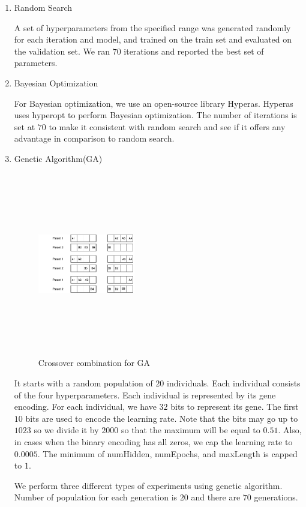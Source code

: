 \documentclass[conference]{IEEEtran}
\begin{document}
\begin{enumerate}
\item Random Search

A set of hyperparameters from the specified range was generated randomly for each iteration and model, and trained on the train set and evaluated on the validation set. We ran $70$ iterations and reported the best set of parameters.


\item Bayesian Optimization

For Bayesian optimization, we use an open-source library Hyperas\cite{hyperas}. Hyperas uses hyperopt\cite{hyperopt} to perform Bayesian optimization. The number of iterations is set at $70$ to make it consistent with random search and see if it offers any advantage in comparison to random search.
\item Genetic Algorithm(GA)
\begin{figure}
\includegraphics[width=0.4\textwidth, height=8cm, keepaspectratio]{GA.png}
\caption{ Crossover combination for GA }
 \label{fig:ga}
\end{figure}

It starts with a random population of $20$ individuals. Each individual consists of the four hyperparameters. Each individual is represented by its gene encoding. For each individual, we have $32$ bits to represent its gene. The first $10$ bits are used to encode the learning rate. Note that the bits may go up to $1023$ so we divide it by $2000$ so that the maximum will be equal to $0.51$. Also, in cases when the binary encoding has all zeros, we cap the learning rate to $0.0005$. The minimum of numHidden, numEpochs, and maxLength is capped to $1$.

We perform three different types of experiments using genetic algorithm. Number of population for each generation is $20$ and there are $70$ generations. 


\end{enumerate}
\end{document}
